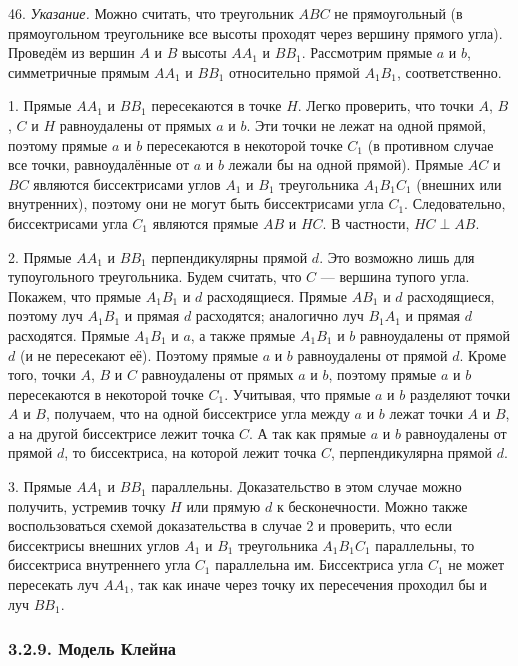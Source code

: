 	46. \textit{Указание.} Можно считать, что треугольник $ABC$ не прямоугольный (в прямоугольном треугольнике все высоты проходят через вершину прямого угла). Проведём из вершин $A$ и $B$ высоты $AA_1$ и $BB_1$. Рассмотрим прямые $a$ и $b$, симметричные прямым $AA_1$ и $BB_1$ относительно прямой $A_1B_1$, соответственно.

	1. Прямые $AA_1$ и $BB_1$ пересекаются в точке $H$. Легко проверить, что точки $A$, $B$, $C$ и $H$ равноудалены от прямых $a$ и $b$. Эти точки не лежат на одной прямой, поэтому прямые $a$ и $b$ пересекаются в некоторой точке $C_1$ (в противном случае все точки, равноудалённые от $a$ и $b$ лежали бы на одной прямой). Прямые $AC$ и $BC$ являются биссектрисами углов $A_1$ и $B_1$ треугольника $A_1B_1C_1$ (внешних или внутренних), поэтому они не могут быть биссектрисами угла $C_1$. Следовательно, биссектрисами угла $C_1$ являются прямые $AB$ и $HC$. В частности, $HC \perp AB$.

	2. Прямые $AA_1$ и $BB_1$ перпендикулярны прямой $d$. Это возможно лишь для тупоугольного треугольника. Будем считать, что $C$ --- вершина тупого угла. Покажем, что прямые $A_1B_1$ и $d$ расходящиеся. Прямые $AB_1$ и $d$ расходящиеся, поэтому луч $A_1B_1$ и прямая $d$ расходятся; аналогично луч $B_1A_1$ и прямая $d$ расходятся. Прямые $A_1B_1$ и $a$, а также прямые $A_1B_1$ и $b$ равноудалены от прямой $d$ (и не пересекают её). Поэтому прямые $a$ и $b$ равноудалены от прямой $d$. Кроме того, точки $A$, $B$ и $C$ равноудалены от прямых $a$ и $b$, поэтому прямые $a$ и $b$ пересекаются в некоторой точке $C_1$. Учитывая, что прямые $a$ и $b$ разделяют точки $A$ и $B$, получаем, что на одной биссектрисе угла между $a$ и $b$ лежат точки $A$ и $B$, а на другой биссектрисе лежит точка $C$. А так как прямые $a$ и $b$ равноудалены от прямой $d$, то биссектриса, на которой лежит точка $C$, перпендикулярна прямой $d$.

	3. Прямые $AA_1$ и $BB_1$ параллельны. Доказательство в этом случае можно получить, устремив точку $H$ или прямую $d$ к бесконечности. Можно также воспользоваться схемой доказательства в случае 2 и проверить, что если биссектрисы внешних углов $A_1$ и $B_1$ треугольника $A_1B_1C_1$ параллельны, то биссектриса внутреннего угла $C_1$ параллельна им. Биссектриса угла $C_1$ не может пересекать луч $AA_1$, так как иначе через точку их пересечения проходил бы и луч $BB_1$.

	\subsubsection{3.2.9. Модель Клейна}
 
